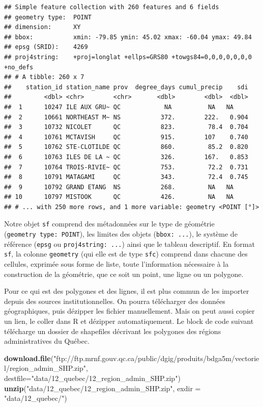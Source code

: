 \documentclass[]{book}
\newenvironment{Shaded}{\begin{snugshade}}{\end{snugshade}}
\newcommand{\DataTypeTok}[1]{\textcolor[rgb]{0.13,0.29,0.53}{#1}}
\newcommand{\KeywordTok}[1]{\textcolor[rgb]{0.13,0.29,0.53}{\textbf{#1}}}
\newcommand{\NormalTok}[1]{#1}
\newcommand{\StringTok}[1]{\textcolor[rgb]{0.31,0.60,0.02}{#1}}
\begin{document}
\begin{verbatim}
## Simple feature collection with 260 features and 6 fields
## geometry type:  POINT
## dimension:      XY
## bbox:           xmin: -79.85 ymin: 45.02 xmax: -60.04 ymax: 49.84
## epsg (SRID):    4269
## proj4string:    +proj=longlat +ellps=GRS80 +towgs84=0,0,0,0,0,0,0 +no_defs
## # A tibble: 260 x 7
##    station_id station_name prov  degree_days cumul_precip    sdi
##         <dbl> <chr>        <chr>       <dbl>        <dbl>  <dbl>
##  1      10247 ILE AUX GRU~ QC            NA          NA   NA    
##  2      10661 NORTHEAST M~ NS           372.        222.   0.904
##  3      10732 NICOLET      QC           823.         78.4  0.704
##  4      10761 MCTAVISH     QC           915.        107    0.740
##  5      10762 STE-CLOTILDE QC           860.         85.2  0.820
##  6      10763 ILES DE LA ~ QC           326.        167.   0.853
##  7      10764 TROIS-RIVIE~ QC           753.         72.2  0.731
##  8      10791 MATAGAMI     QC           343.         72.4  0.745
##  9      10792 GRAND ETANG  NS           268.         NA   NA    
## 10      10797 MISTOOK      QC           426.         NA   NA    
## # ... with 250 more rows, and 1 more variable: geometry <POINT [°]>
\end{verbatim}

Notre objet \texttt{sf} comprend des métadonnées sur le type de
géométrie (\texttt{geometry\ type:\ POINT}), les limites des objets
(\texttt{bbox:\ ...}), le système de référence (\texttt{epsg} ou
\texttt{proj4string:\ ...}) ainsi que le tableau descriptif. En format
\texttt{sf}, la colonne \texttt{geometry} (qui elle est de type
\texttt{sfc}) comprend dans chacune des cellules, exprimée sous forme de
liste, toute l'information nécessaire à la construction de la géométrie,
que ce soit un point, une ligne ou un polygone.

Pour ce qui est des polygones et des lignes, il est plus commun de les
importer depuis des sources institutionnelles. On pourra télécharger des
données géographiques, puis dézipper les fichier manuellement. Mais on
peut aussi copier un lien, le coller dans R et dézipper automatiquement.
Le block de code suivant télécharge un dossier de shapefiles décrivant
les polygones des régions administratives du Québec.

\begin{Shaded}
\begin{Highlighting}[]
\KeywordTok{download.file}\NormalTok{(}\StringTok{"ftp://ftp.mrnf.gouv.qc.ca/public/dgig/produits/bdga5m/vectoriel/region_admin_SHP.zip"}\NormalTok{,}
              \DataTypeTok{destfile=}\StringTok{"data/12_quebec/12_region_admin_SHP.zip"}\NormalTok{)}
\KeywordTok{unzip}\NormalTok{(}\StringTok{"data/12_quebec/12_region_admin_SHP.zip"}\NormalTok{, }\DataTypeTok{exdir =} \StringTok{"data/12_quebec/"}\NormalTok{)}
\end{Highlighting}
\end{Shaded}
\end{document}
